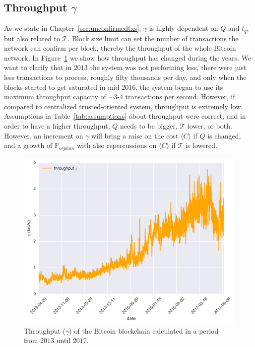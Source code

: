 \documentclass[USenglish]{uit-thesis}
\begin{document}
\subsection{Throughput $\gamma$}
\label{sec:throughput}
As we state in Chapter~\ref{sec:unconfirmedtxs}, $\gamma$
is highly dependent on $Q$ and $t_q$, but also related
to $\mathcal{T}$. Block size limit can set the
number of transactions the network can confirm
per block, thereby the throughput of the whole Bitcoin
network. In Figure~\ref{fig:throughput} we show how
throughput has changed during the years. We want to clarify that
in $2013$ the system was not performing less, there were just less
transactions to process, roughly fifty thousands per day, and
only when the blocks started to get saturated in mid $2016$,
the system began to use its maximum throughput capacity of
$\sim$$3$-$4$ transactions per second. However,
if compared to centralized trusted-oriented
system, throughput is extremely low.
Assumptions in Table~\ref{tab:assumptions} about
throughput were correct, and in order to have a higher
throughput, $Q$ needs to be bigger,
$\mathcal{T}$ lower, or both.
However, an increment on $\gamma$ will bring
a raise on the cost $\langle C\rangle$ if $Q$ is changed, and
a growth of $\mathbb{P}_{orphan}$ with also repercussions
on $\langle C\rangle$ if $\mathcal{T}$ is lowered.
\begin{figure}[h]
	\centering
	\includegraphics[width=1\textwidth]{img/throughput}
	\caption{Throughput ($\gamma$) of the Bitcoin blockchain calculated in a period from $2013$ until $2017$.}
	\label{fig:throughput}
\end{figure}
\end{document}
